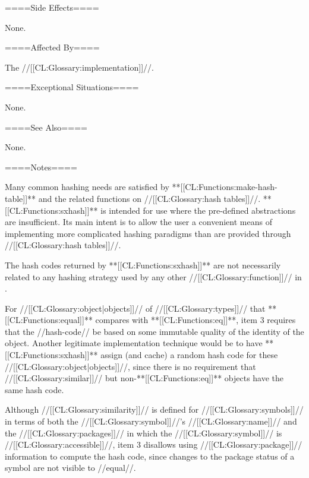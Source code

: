 ====Side Effects====

None.

====Affected By====

The //[[CL:Glossary:implementation]]//.

====Exceptional Situations====

None.

====See Also====

None.

====Notes====

Many common hashing needs are satisfied by **[[CL:Functions:make-hash-table]]** and the related functions on //[[CL:Glossary:hash tables]]//. **[[CL:Functions:sxhash]]** is intended for use where the pre-defined abstractions are insufficient. Its main intent is to allow the user a convenient means of implementing more complicated hashing paradigms than are provided through //[[CL:Glossary:hash tables]]//.

The hash codes returned by **[[CL:Functions:sxhash]]** are not necessarily related to any hashing strategy used by any other //[[CL:Glossary:function]]// in \clisp.

For //[[CL:Glossary:object|objects]]// of //[[CL:Glossary:types]]// that **[[CL:Functions:equal]]** compares with **[[CL:Functions:eq]]**, item 3 requires that the //hash-code// be based on some immutable quality of the identity of the object. Another legitimate implementation technique would be to have **[[CL:Functions:sxhash]]** assign (and cache) a random hash code for these //[[CL:Glossary:object|objects]]//, since there is no requirement that //[[CL:Glossary:similar]]// but non-**[[CL:Functions:eq]]** objects have the same hash code.

Although //[[CL:Glossary:similarity]]// is defined for //[[CL:Glossary:symbols]]// in terms of both the //[[CL:Glossary:symbol]]//'s //[[CL:Glossary:name]]// and the //[[CL:Glossary:packages]]// in which the //[[CL:Glossary:symbol]]// is //[[CL:Glossary:accessible]]//, item 3 disallows using //[[CL:Glossary:package]]// information to compute the hash code, since changes to the package status of a symbol are not visible to //equal//.

